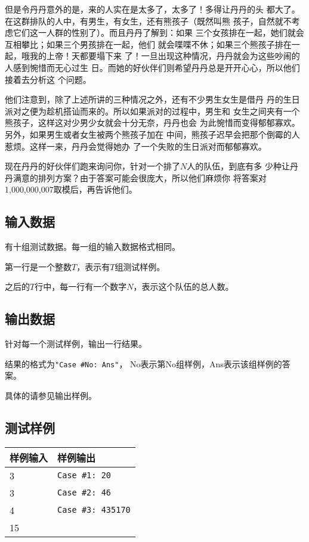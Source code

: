 \documentclass{article}
\begin{document}
但是令丹丹意外的是，来的人实在是太多了，太多了！多得让丹丹的头
都大了。在这群排队的人中，有男生，有女生，还有熊孩子（既然叫熊
孩子，自然就不考虑它们这一人群的性别了）。而且丹丹了解到：如果
三个女孩排在一起，她们就会互相攀比；如果三个男孩排在一起，他们
就会喋喋不休；如果三个熊孩子排在一起，哦我的上帝！天都要塌下来
了！一旦出现这种情况，丹丹就会为这些吵闹的人感到惋惜而无心过生
日。而她的好伙伴们则希望丹丹总是开开心心，所以他们接着去分析这
个问题。

他们注意到，除了上述所讲的三种情况之外，还有不少男生女生是借丹
丹的生日派对之便为趁机搭讪而来的。所以如果派对的过程中，男生和
女生之间夹有一个熊孩子，这样这对少男少女就会十分无奈，丹丹也会
为此惋惜而变得郁郁寡欢。另外，如果男生或者女生被两个熊孩子加在
中间，熊孩子迟早会把那个倒霉的人惹烦。这样一来，丹丹会觉得她办
了一个失败的生日派对而郁郁寡欢。

现在丹丹的好伙伴们跑来询问你，针对一个排了$N$人的队伍，到底有多
少种让丹丹满意的排列方案？由于答案可能会很庞大，所以他们麻烦你
将答案对1,000,000,007取模后，再告诉他们。

\subsection*{输入数据}
有十组测试数据。每一组的输入数据格式相同。

第一行是一个整数$T$，表示有$T$组测试样例。

之后的$T$行中，每一行有一个数字$N$，表示这个队伍的总人数。

\subsection*{输出数据}
针对每一个测试样例，输出一行结果。

结果的格式为{\tt "Case \#No: Ans"}，
No表示第No组样例，Ans表示该组样例的答案。

具体的请参见输出样例。

\subsection*{测试样例}
\begin{flushleft}
\begin{tabular}{|p{6cm}|p{6cm}|}
 \hline \bfseries{样例输入} & \bfseries{样例输出} \\
 \hline 
    3 & {\tt Case \#1: 20} \\
    3 & {\tt Case \#2: 46} \\
    4 & {\tt Case \#3: 435170} \\
    15 & \\
 \hline 
\end{tabular}
\end{flushleft}
\end{document}
